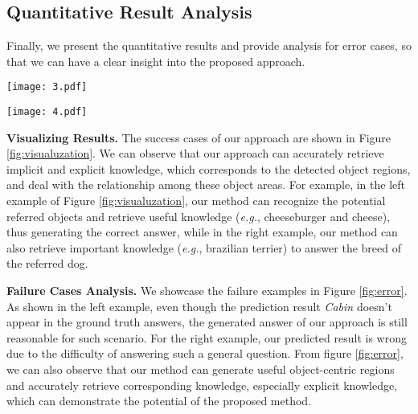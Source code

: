 \documentclass{article}
\begin{document}
\subsection{Quantitative Result Analysis}
\label{error}
Finally, we present the quantitative results and provide analysis for error cases, so that we can have a clear insight into the proposed approach.

\begin{figure*}[t]
\begin{center}
\texttt{[image: 3.pdf]}
\end{center}
    \vspace{-3mm}
   \caption{Representative success cases of the proposed \textit{REVIVE} on OK-VQA dataset \cite{marino2019ok}. \textit{``Q"}, \textit{``C"}, \textit{``A"} and \textit{``GT"} denote question, context, predictive answer, ground truth answers respectively. Note that the underlined text represents regional tags and five tags are selected for illustration. We rescale all the object regions to the same size for a clearer view. \textit{``Acc."} means accuracy.}
\vspace{-4mm}
\label{fig:visualuzation}
\end{figure*}

\begin{figure*}[t]
\begin{center}
\texttt{[image: 4.pdf]}
\end{center}
    \vspace{-3mm}
   \caption{Representative failure cases of the proposed \textit{REVIVE} on OK-VQA dataset \cite{marino2019ok}.}
\vspace{-4mm}
\label{fig:error}
\end{figure*}

\textbf{Visualizing Results. } The success cases of our approach are shown in Figure \ref{fig:visualuzation}. We can observe that our approach can accurately retrieve implicit and explicit knowledge, which corresponds to the detected object regions, and deal with the relationship among these object areas. For example, in the left example of Figure \ref{fig:visualuzation}, our method can recognize the potential referred objects and retrieve useful knowledge (\textit{e.g.}, cheeseburger and cheese), thus generating the correct answer, while in the right example, our method can also retrieve important knowledge (\textit{e.g.}, brazilian terrier) to answer the breed of the referred dog.

\textbf{Failure Cases Analysis. } We showcase the failure examples in Figure \ref{fig:error}. As shown in the left example, even though the prediction result \textit{Cabin} doesn't appear in the ground truth answers, the generated answer of our approach is still reasonable for such scenario. For the right example, our predicted result is wrong due to the difficulty of answering such a general question. From figure \ref{fig:error}, we can also observe that our method can generate useful object-centric regions and accurately retrieve corresponding knowledge, especially explicit knowledge, which can demonstrate the potential of the proposed method.
\end{document}
